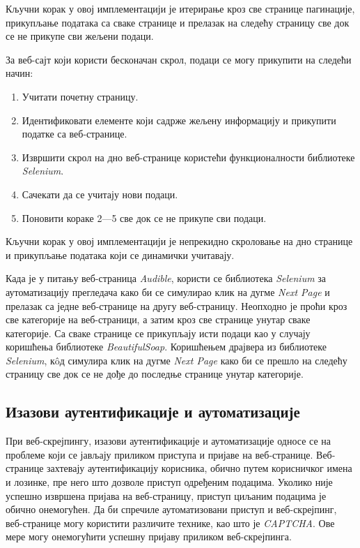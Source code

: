 \documentclass[12pt,oneside]{memoir}
\begin{document}
Кључни корак у овој имплементацији је итерирање кроз све странице пагинације, прикупљање података са сваке странице и прелазак на следећу страницу све док се не прикупе сви жељени подаци.

За веб-сајт који користи бесконачан скрол, подаци се могу прикупити на следећи начин:
\begin{enumerate}
  \item Учитати почетну страницу.
  \item Идентификовати елементе који садрже жељену информацију и прикупити податке са веб-странице.
  \item Извршити скрол на дно веб-странице користећи функционалности библиотеке \textit{Selenium}.
  \item Сачекати да се учитају нови подаци.
  \item Поновити кораке 2---5 све док се не прикупе сви подаци.
\end{enumerate}

Кључни корак у овој имплементацији је непрекидно скроловање на дно странице и прикупљање података који се динамички учитавају.

Када је у питању веб-страница \textit{Audible}, користи се библиотека \textit{Selenium} за аутоматизацију прегледача како би се симулирао клик на дугме \textit{Next Page} и прелазак са једне веб-странице на другу веб-страницу. Неопходно је проћи кроз све категорије на веб-страници, а затим кроз све странице унутар сваке категорије. Са сваке странице се прикупљају исти подаци као у случају коришћења библиотеке \textit{BeautifulSoap}. Коришћењем драјвера из библиотеке \textit{Selenium}, кôд симулира клик на дугме \textit{Next Page} како би се прешло на следећу страницу све док се не дође до последње странице унутар категорије. 

\subsection{Изазови аутентификације и аутоматизације}
\label{chp:login}
При веб-скрејпингу, изазови аутентификације и аутоматизације односе се на проблеме који се јављају приликом приступа и пријаве на веб-странице. Веб-странице захтевају аутентификацију корисника, обично путем корисничког имена и лозинке, пре него што дозволе приступ одређеним подацима. Уколико није успешно извршена пријава на веб-страницу, приступ циљаним подацима је обично онемогућен. Да би спречиле аутоматизовани приступ и веб-скрејпинг, веб-странице могу користити различите технике, као што је \textit{CAPTCHA}. Ове мере могу онемогућити успешну пријаву приликом веб-скрејпинга.
\end{document}
